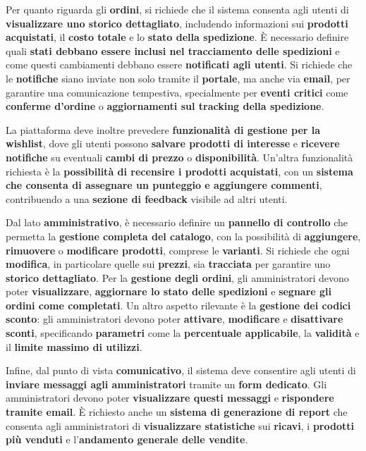 \documentclass[a4paper,12pt]{report}
\begin{document}
	Per quanto riguarda gli \textbf{ordini}, si richiede che il sistema consenta agli utenti di \textbf{visualizzare uno storico dettagliato}, includendo informazioni sui \textbf{prodotti acquistati}, il \textbf{costo totale} e lo \textbf{stato della spedizione}. È necessario definire quali \textbf{stati debbano essere inclusi nel tracciamento delle spedizioni} e come questi cambiamenti debbano essere \textbf{notificati agli utenti}. Si richiede che le \textbf{notifiche} siano inviate non solo tramite il \textbf{portale}, ma anche via \textbf{email}, per garantire una comunicazione tempestiva, specialmente per \textbf{eventi critici} come \textbf{conferme d’ordine} o \textbf{aggiornamenti sul tracking della spedizione}.
	
	La piattaforma deve inoltre prevedere \textbf{funzionalità di gestione per la wishlist}, dove gli utenti possono \textbf{salvare prodotti di interesse} e \textbf{ricevere notifiche} su eventuali \textbf{cambi di prezzo} o \textbf{disponibilità}. Un’altra funzionalità richiesta è la \textbf{possibilità di recensire i prodotti acquistati}, con un \textbf{sistema che consenta di assegnare un punteggio e aggiungere commenti}, contribuendo a una \textbf{sezione di feedback} visibile ad altri utenti.
	
	Dal lato \textbf{amministrativo}, è necessario definire un \textbf{pannello di controllo} che permetta la \textbf{gestione completa del catalogo}, con la possibilità di \textbf{aggiungere}, \textbf{rimuovere} o \textbf{modificare prodotti}, comprese le \textbf{varianti}. Si richiede che ogni \textbf{modifica}, in particolare quelle sui \textbf{prezzi}, sia \textbf{tracciata} per garantire uno \textbf{storico dettagliato}. Per la \textbf{gestione degli ordini}, gli amministratori devono poter \textbf{visualizzare}, \textbf{aggiornare lo stato delle spedizioni} e \textbf{segnare gli ordini come completati}. Un altro aspetto rilevante è la \textbf{gestione dei codici sconto}: gli amministratori devono poter \textbf{attivare}, \textbf{modificare} e \textbf{disattivare sconti}, specificando \textbf{parametri} come la \textbf{percentuale applicabile}, la \textbf{validità} e il \textbf{limite massimo di utilizzi}.
	
	Infine, dal punto di vista \textbf{comunicativo}, il sistema deve consentire agli utenti di \textbf{inviare messaggi agli amministratori} tramite un \textbf{form dedicato}. Gli amministratori devono poter \textbf{visualizzare questi messaggi} e \textbf{rispondere tramite email}. È richiesto anche un \textbf{sistema di generazione di report} che consenta agli amministratori di \textbf{visualizzare statistiche} sui \textbf{ricavi}, i \textbf{prodotti più venduti} e l’\textbf{andamento generale delle vendite}.
	
\end{document}
